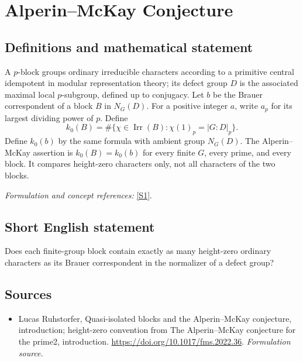 \documentclass[11pt]{article}
\begin{document}
\section*{\texorpdfstring{Alperin–McKay Conjecture}{Alperin–McKay Conjecture}}\label{30005505}
\subsection{Definitions and mathematical statement}
A $p$-block groups ordinary irreducible characters according to a primitive central idempotent in modular representation theory; its defect group $D$ is the associated maximal local $p$-subgroup, defined up to conjugacy. Let $b$ be the Brauer correspondent of a block $B$ in $N_G(D)$. For a positive integer $a$, write $a_p$ for its largest dividing power of $p$. Define
\[
 k_0(B)=\#\{\chi\in\operatorname{Irr}(B):\chi(1)_p=|G:D|_p\}.
\]
Define $k_0(b)$ by the same formula with ambient group $N_G(D)$. The Alperin--McKay assertion is $k_0(B)=k_0(b)$ for every finite $G$, every prime, and every block. It compares height-zero characters only, not all characters of the two blocks.
\par\smallskip\textit{Formulation and concept references:} \href{https://doi.org/10.1017/fms.2022.36}{[S1]}.

\subsection{Short English statement}
Does each finite-group block contain exactly as many height-zero ordinary characters as its Brauer correspondent in the normalizer of a defect group?
\subsection{Sources}
\begin{itemize}
\item[S1]Lucas Ruhstorfer, Quasi-isolated blocks and the Alperin–McKay conjecture, introduction; height-zero convention from The Alperin–McKay conjecture for the prime2, introduction.
\url{https://doi.org/10.1017/fms.2022.36}.
\textit{Formulation source.}
\end{itemize}
\end{document}
